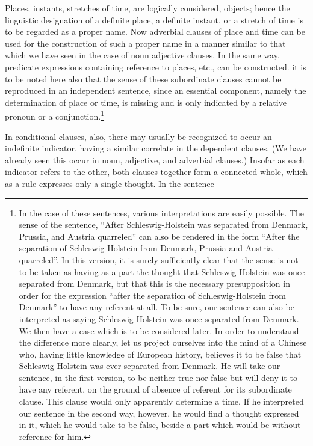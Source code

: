 \documentclass[twoside,12pt]{article}
\begin{document}
Places, instants, stretches of time, are logically considered,
objects; hence the linguistic designation of a definite place, a
definite instant, or a stretch of time is to be regarded as a proper
name. Now adverbial clauses of place and time can be used for the
construction of such a proper name in a manner similar to that which
we have seen in the case of noun adjective clauses. In the same way,
predicate expressions containing reference to places, etc., can be
constructed. it is to be noted here also that the sense of these
subordinate clauses cannot be reproduced in an independent sentence,
since an essential component, namely the determination of place or
time, is missing and is only indicated by a relative pronoun or a
conjunction.\footnote[10]{In the case of these sentences, various
  interpretations are easily possible. The sense of the sentence,
  ``After Schleswig-Holstein was separated from Denmark, Prussia, and
  Austria quarreled'' can also be rendered in the form ``After the
  separation of Schleswig-Holstein from Denmark, Prussia and Austria
  quarreled''. In this version, it is surely sufficiently clear that
  the sense is not to be taken as having as a part the thought that
  Schleswig-Holstein was once separated from Denmark, but that this is
  the necessary presupposition in order for the expression ``after the
  separation of Schleswig-Holstein from Denmark'' to have any referent
  at all. To be sure, our sentence can also be interpreted as saying
  Schleswig-Holstein was once separated from Denmark. We then have a
  case which is to be considered later. In order to understand the
  difference more clearly, let us project ourselves into the mind of a
  Chinese who, having little knowledge of European history, believes
  it to be false that Schleswig-Holstein was ever separated from
  Denmark. He will take our sentence, in the first version, to be
  neither true nor false but will deny it to have any referent, on the
  ground of absence of referent for its subordinate clause. This clause
  would only apparently determine a time. If he interpreted our
  sentence in the second way, however, he would find a thought
  expressed in it, which he would take to be false, beside a part
  which would be without reference for him.}

In conditional clauses, also, there may usually be recognized to occur
an indefinite indicator, having a similar correlate in the dependent
clauses. (We have already seen this occur in noun, adjective, and
adverbial clauses.) Insofar as each indicator refers to the other,
both clauses together form a connected whole, which as a rule
expresses only a single thought. In the sentence
\end{document}
